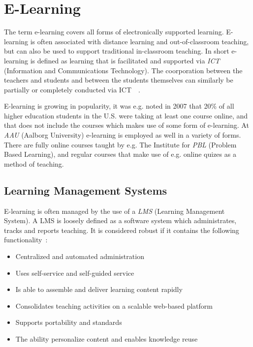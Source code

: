 \section{E-Learning}
The term e-learning covers all forms of electronically supported learning. E-learning is often associated with distance learning and out-of-classroom teaching, but can also be used to support traditional in-classroom teaching. In short e-learning is defined as learning that is facilitated and supported via \emph{ICT} (Information and Communications Technology). The coorporation between the teachers and students and between the students themselves can similarly be partially or completely conducted via ICT~\citep{def_e-learning1}~\citep{def_e-learning2}.

E-learning is growing in popularity, it was e.g. noted in 2007 that 20\% of all higher education students in the U.S. were taking at least one course online, and that does not include the courses which makes use of some form of e-learning.	At \emph{AAU} (Aalborg University) e-learning is employed as well in a variety of forms. There are fully online courses taught by e.g. The Institute for \emph{PBL} (Problem Based Learning)\cite{mpbl}, and regular courses that make use of e.g. online quizes as a method of teaching. 

\subsection{Learning Management Systems}
E-learning is often managed by the use of a \emph{LMS} (Learning Management System). A LMS is loosely defined as a software system which administrates, tracks and reports teaching. It is considered robust if it contains the following functionality~\citep{Ellis09}:

\begin{itemize}
	\item Centralized and automated administration
	\item Uses self-service and self-guided service
	\item Is able to assemble and deliver learning content rapidly
	\item Consolidates teaching activities on a scalable web-based platform
	\item Supports portability and standards
	\item The ability personalize content and enables knowledge reuse
\end{itemize}


